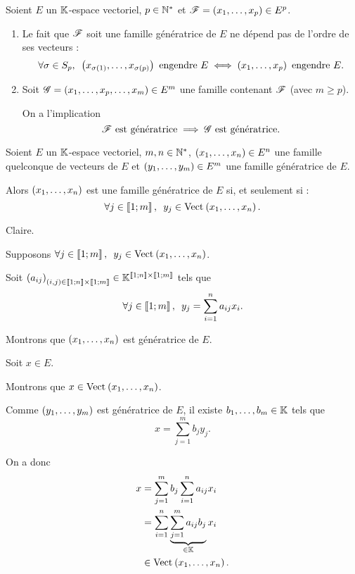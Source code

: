 \begin{rem}
Soient \(E\) un \(\mathbb{K}\)-espace vectoriel, \(p\in\mathbb{N}^*\) et \(\mathscr{F}=\left(x_1,\dots,x_p\right)\in E^p\).

\begin{enumerate}
\item Le fait que \(\mathscr{F}\) soit une famille génératrice de \(E\) ne dépend pas de l'ordre de ses vecteurs : \[\quantifs{\forall\sigma\in S_p}\paren{x_{\sigma\paren{1}},\dots,x_{\sigma\paren{p}}}\text{ engendre }E\ssi\paren{x_1,\dots,x_p}\text{ engendre }E.\]

\item Soit \(\mathscr{G}=\left(x_1,\dots,x_p,\dots,x_m\right)\in E^m\) une famille contenant \(\mathscr{F}\) (avec \(m\geq p\)).

On a l'implication \[\mathscr{F}\text{ est génératrice}\implies\mathscr{G}\text{ est génératrice}.\]
\end{enumerate}
\end{rem}

\begin{prop}
Soient \(E\) un \(\mathbb{K}\)-espace vectoriel, \(m,n\in\mathbb{N}^*\), \(\left(x_1,\dots,x_n\right)\in E^n\) une famille quelconque de vecteurs de \(E\) et \(\left(y_1,\dots,y_m\right)\in E^m\) une famille génératrice de \(E\).

Alors \(\left(x_1,\dots,x_n\right)\) est une famille génératrice de \(E\) si, et seulement si : \[\quantifs{\forall j\in\interventierii{1}{m}}y_j\in\Vect{x_1,\dots,x_n}.\]
\end{prop}

\begin{dem}
\impdir Claire.

\imprec

Supposons \(\quantifs{\forall j\in\interventierii{1}{m}}y_j\in\Vect{x_1,\dots,x_n}\).

Soit \(\left(a_{ij}\right)_{\left(i,j\right)\in\left\llbracket1;n\right\rrbracket\times\left\llbracket1;m\right\rrbracket}\in\mathbb{K}^{\left\llbracket1;n\right\rrbracket\times\left\llbracket1;m\right\rrbracket}\) tels que \[\quantifs{\forall j\in\interventierii{1}{m}}y_j=\sum_{i=1}^na_{ij}x_i.\]

Montrons que \(\left(x_1,\dots,x_n\right)\) est génératrice de \(E\).

Soit \(x\in E\).

Montrons que \(x\in\Vect{x_1,\dots,x_n}\).

Comme \(\left(y_1,\dots,y_m\right)\) est génératrice de \(E\), il existe \(b_1,\dots,b_m\in\mathbb{K}\) tels que \[x=\sum_{j=1}^mb_jy_j.\]

On a donc \[\begin{aligned}
x&=\sum_{j=1}^mb_j\sum_{i=1}^na_{ij}x_i \\
&=\sum_{i=1}^n\underbrace{\sum_{j=1}^ma_{ij}b_j}_{\in\K}x_i \\
&\in\Vect{x_1,\dots,x_n}.
\end{aligned}\]
\end{dem}

